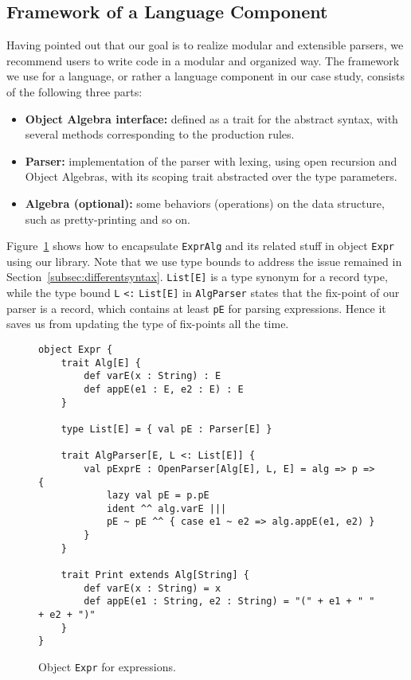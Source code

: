 \subsection{Framework of a Language Component}\label{subsec:framework}

Having pointed out that our goal is to realize modular and extensible parsers, we recommend users to write code in a modular and
organized way. The framework we use for a language, or rather a language component in our case study, consists of the following three
parts:
\begin{itemize}
\item \textbf{Object Algebra interface:} defined as a trait for the abstract syntax, with several methods corresponding to the production rules.
\item \textbf{Parser:} implementation of the parser with lexing, using open recursion and Object Algebras, with its scoping trait abstracted over the type parameters.
\item \textbf{Algebra (optional):} some behaviors (operations) on the data structure, such as pretty-printing and so on.
\end{itemize}

Figure~\ref{fig:objectexpr} shows how to encapsulate \lstinline{ExprAlg} and its related stuff in object \lstinline{Expr} using our library. Note that we use type bounds to address the issue remained in Section~\ref{subsec:differentsyntax}. \lstinline{List[E]} is a type synonym for a record type, while the type bound \lstinline{L} \lstinline{<:} \lstinline{List[E]} in \lstinline{AlgParser} states that the fix-point of our parser is a record, which contains at least \lstinline{pE} for parsing expressions. Hence it saves us from updating the type of fix-points all the time.

\begin{figure}[htbp]
\centering
\begin{lstlisting}
object Expr {
    trait Alg[E] {
        def varE(x : String) : E
        def appE(e1 : E, e2 : E) : E
    }

    type List[E] = { val pE : Parser[E] }

    trait AlgParser[E, L <: List[E]] {
        val pExprE : OpenParser[Alg[E], L, E] = alg => p => {
            lazy val pE = p.pE
            ident ^^ alg.varE |||
            pE ~ pE ^^ { case e1 ~ e2 => alg.appE(e1, e2) }
        }
    }

    trait Print extends Alg[String] {
        def varE(x : String) = x
        def appE(e1 : String, e2 : String) = "(" + e1 + " " + e2 + ")"
    }
}
\end{lstlisting}
\caption{Object \lstinline{Expr} for expressions.}\label{fig:objectexpr}
\end{figure}

